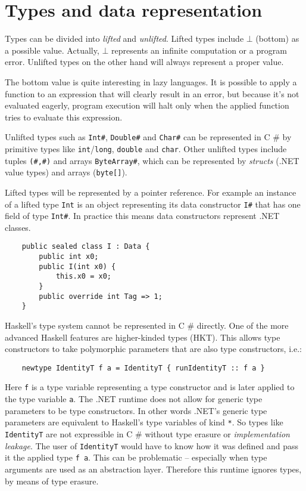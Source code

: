 \documentclass[en]{pracamgr}
\newcommand{\shrp}{%
  {\fontfamily{ppl}\selectfont\#%
  }}
\begin{document}
\section{Types and data representation}\label{s:data_rep}

Types can be divided into \textit{lifted} and \textit{unlifted}.
Lifted types include $\bot$ (bottom) as a possible value.
Actually, $\bot$ represents an infinite computation or
a program error. Unlifted types on the other hand will
always represent a proper value.

The bottom value is quite interesting in lazy languages.
It is possible to apply a function to an expression that
will clearly result in an error, but because it's not evaluated
eagerly, program execution will halt only when the applied function
tries to evaluate this expression.

Unlifted types such as \texttt{Int\#}, \texttt{Double\#}
and \texttt{Char\#} can be represented in C\shrp{} by
primitive types like \texttt{int}/\texttt{long}, \texttt{double} and \texttt{char}.
Other unlifted types include tuples \texttt{(\#,\#)} and
arrays \texttt{ByteArray\#}, which can be represented by
\textit{structs} (.NET value types) and arrays (\texttt{byte[]}).

Lifted types will be represented by a pointer reference.
For example an instance of a lifted type \texttt{Int} is an object representing
its data constructor \texttt{I\#} that has one field of type \texttt{Int\#}.
In practice this means data constructors represent .NET classes.

\begin{verbatim}
    public sealed class I : Data {
        public int x0;
        public I(int x0) {
            this.x0 = x0;
        }
        public override int Tag => 1;
    }
\end{verbatim}

Haskell's type system cannot be represented in C\shrp{} directly.
One of the more advanced Haskell features are higher-kinded types (HKT).
This allows type constructors to take polymorphic parameters
that are also type constructors, i.e.:

\begin{verbatim}
    newtype IdentityT f a = IdentityT { runIdentityT :: f a }
\end{verbatim}

Here \texttt{f} is a type variable representing a type constructor
and is later applied to the type variable \texttt{a}.
The .NET runtime does not allow for generic type parameters to be
type constructors. In other words .NET's generic type parameters are
equivalent to Haskell's type variables of kind \texttt{*}.
So types like \texttt{IdentityT} are not
expressible in C\shrp{} without type erasure or \textit{implementation leakage}.
The user of \texttt{IdentityT} would have to know how it
was defined and pass it the applied type \texttt{f a}. This can be
problematic -- especially when type arguments are used as an abstraction layer.
Therefore this runtime ignores types, by
means of type erasure.
\end{document}
